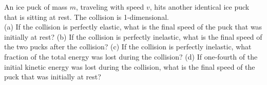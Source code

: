 An ice puck of mass $m$, traveling with speed $v$, hits another identical ice
puck that is sitting at rest. The collision is 1-dimensional.\\
%
(a) If the collision is perfectly elastic, what is the final speed of
the puck that was initially at rest?\answercheck\hwendpart
%
(b) If the collision is perfectly inelastic, what is the final speed
of the two pucks after the collision?\answercheck\hwendpart
%
(c) If the collision is perfectly inelastic, what fraction of the
total energy was lost during the collision?\answercheck\hwendpart
%
(d) If one-fourth of the initial kinetic energy was lost during the
collision, what is the final speed of the puck that was initially at
rest?\answercheck

